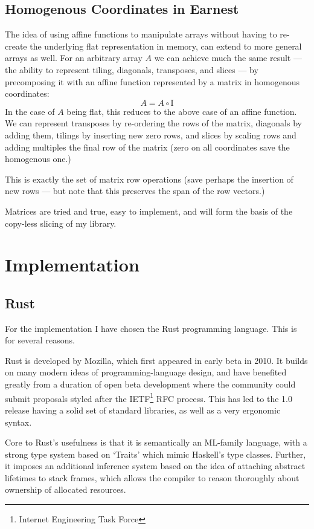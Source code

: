 \documentclass{DIKU-report-variant}
\newcommand\mrm[1]{\mathrm{#1}}
\newcommand\brm[1]{\bm{\mrm{#1}}}
\begin{document}
\section{Homogenous Coordinates in Earnest}

The idea of using affine functions to manipulate arrays without having to re-create the underlying flat
representation in memory, can extend to more general arrays as well. For an arbitrary array \(A\) we can
achieve much the same result --- the ability to represent tiling, diagonals, transposes, and slices ---
by precomposing it with an affine function represented by a matrix in homogenous coordinates:
\[ A = A \circ \brm I \]
In the case of \(A\) being flat, this reduces to the above case of an affine function.
We can represent transposes by re-ordering the rows of the matrix, diagonals by adding them, tilings by
inserting new zero rows, and slices by scaling rows and adding multiples the final row of the matrix (zero
on all coordinates save the homogenous one.)

This is exactly the set of matrix row operations (save perhaps the insertion of new rows --- but note that
this preserves the span of the row vectors.)

Matrices are tried and true, easy to implement, and will form the basis of the copy-less slicing of my library.

\chapter{Implementation}

\section{Rust}

For the implementation I have chosen the Rust programming language. This
is for several reasons.

Rust is developed by Mozilla, which first appeared in early beta in 2010. It
builds on many modern ideas of programming-language design, and have benefited
greatly from a duration of open beta development where the community could submit
proposals styled after the IETF\footnote{Internet Engineering Task Force}
RFC process. This has led to the 1.0 release having a solid set of standard libraries,
as well as a very ergonomic syntax.

Core to Rust's usefulness is that it is semantically an ML-family language, with a strong type
system based on `Traits' which mimic Haskell's type classes. Further, it imposes an additional
inference system based on the idea of attaching abstract lifetimes to stack frames, which allows
the compiler to reason thoroughly about ownership of allocated resources.
\end{document}
